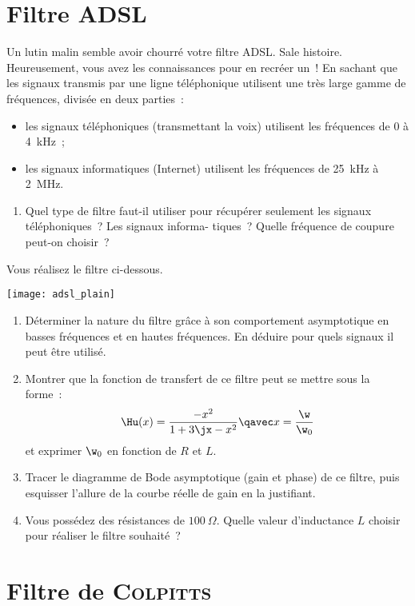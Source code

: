 \documentclass[a4paper, 12pt, final, garamond]{book}
\begin{document}
\section{Filtre ADSL}
Un lutin malin semble avoir chourré votre filtre ADSL. Sale histoire.
Heureusement, vous avez les connaissances pour en recréer un~! En sachant que
les signaux transmis par une ligne téléphonique utilisent une très large gamme
de fréquences, divisée en deux parties~:
\begin{itemize}
	\item les signaux téléphoniques (transmettant la voix) utilisent les
	      fréquences de 0 à \SI{4}{kHz}~;
	\item les signaux informatiques (Internet) utilisent les fréquences de
	      \SI{25}{kHz} à \SI{2}{MHz}.
\end{itemize}

\begin{enumerate}
	\item Quel type de filtre faut-il utiliser pour récupérer seulement les
	      signaux téléphoniques~? Les signaux informa- tiques~? Quelle fréquence
	      de coupure peut-on choisir~?
\end{enumerate}
Vous réalisez le filtre ci-dessous.
\begin{center}
	\texttt{[image: adsl\_plain]}
\end{center}

\begin{enumerate}[resume]
	\item Déterminer la nature du filtre grâce à son comportement asymptotique
	      en basses fréquences et en hautes fréquences. En déduire pour quels
	      signaux il peut être utilisé.
	\item Montrer que la fonction de transfert de ce filtre peut se mettre sous
	      la forme~:
	      \[\Hu(x) = \frac{-x^2}{1 + 3\jx-x^2}
		      \qavec
		      x = \frac{\w}{\w_0}
	      \]
	      et exprimer $\w_0$ en fonction de $R$ et $L$.
	\item Tracer le diagramme de Bode asymptotique (gain et phase) de ce filtre,
	      puis esquisser l'allure de la courbe réelle de gain en la justifiant.
	\item Vous possédez des résistances de $\SI{100}{\Omega}$. Quelle valeur
	      d'inductance $L$ choisir pour réaliser le filtre souhaité~?
\end{enumerate}

\section{Filtre de \textsc{Colpitts}}
\end{document}
